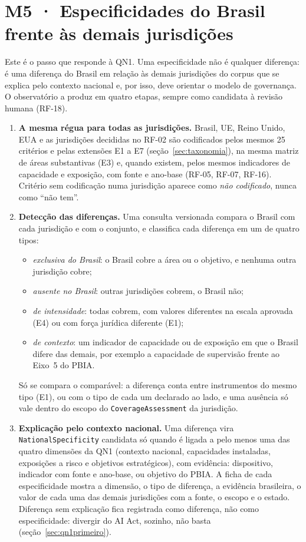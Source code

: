 \documentclass[12pt,a4paper,oneside,english,brazil]{abntex2}
\newcommand{\rf}[1]{{\footnotesize(#1)}}
\begin{document}
\section{M5 · Especificidades do Brasil frente às demais jurisdições}\label{sec:especificidades}
Este é o passo que responde à QN1. Uma especificidade não é qualquer diferença: é uma diferença do Brasil em relação às demais jurisdições do corpus que se explica pelo contexto nacional e, por isso, deve orientar o modelo de governança. O observatório a produz em quatro etapas, sempre como candidata à revisão humana \rf{RF-18}.

\begin{enumerate}[leftmargin=*]
  \item \textbf{A mesma régua para todas as jurisdições.} Brasil, UE, Reino Unido, EUA e as jurisdições decididas no RF-02 são codificados pelos mesmos 25 critérios e pelas extensões E1 a E7 (seção~\ref{sec:taxonomia}), na mesma matriz de áreas substantivas (E3) e, quando existem, pelos mesmos indicadores de capacidade e exposição, com fonte e ano-base \rf{RF-05, RF-07, RF-16}. Critério sem codificação numa jurisdição aparece como \emph{não codificado}, nunca como ``não tem''.
  \item \textbf{Detecção das diferenças.} Uma consulta versionada compara o Brasil com cada jurisdição e com o conjunto, e classifica cada diferença em um de quatro tipos:
    \begin{itemize}
      \item \emph{exclusiva do Brasil}: o Brasil cobre a área ou o objetivo, e nenhuma outra jurisdição cobre;
      \item \emph{ausente no Brasil}: outras jurisdições cobrem, o Brasil não;
      \item \emph{de intensidade}: todas cobrem, com valores diferentes na escala aprovada (E4) ou com força jurídica diferente (E1);
      \item \emph{de contexto}: um indicador de capacidade ou de exposição em que o Brasil difere das demais, por exemplo a capacidade de supervisão frente ao Eixo~5 do PBIA.
    \end{itemize}
    Só se compara o comparável: a diferença conta entre instrumentos do mesmo tipo (E1), ou com o tipo de cada um declarado ao lado, e uma ausência só vale dentro do escopo do \texttt{CoverageAssessment} da jurisdição.
  \item \textbf{Explicação pelo contexto nacional.} Uma diferença vira \texttt{NationalSpecificity} candidata só quando é ligada a pelo menos uma das quatro dimensões da QN1 (contexto nacional, capacidades instaladas, exposições a risco e objetivos estratégicos), com evidência: dispositivo, indicador com fonte e ano-base, ou objetivo do PBIA. A ficha de cada especificidade mostra a dimensão, o tipo de diferença, a evidência brasileira, o valor de cada uma das demais jurisdições com a fonte, o escopo e o estado. Diferença sem explicação fica registrada como diferença, não como especificidade: divergir do AI Act, sozinho, não basta (seção~\ref{sec:qn1primeiro}).

\end{enumerate}
\end{document}
